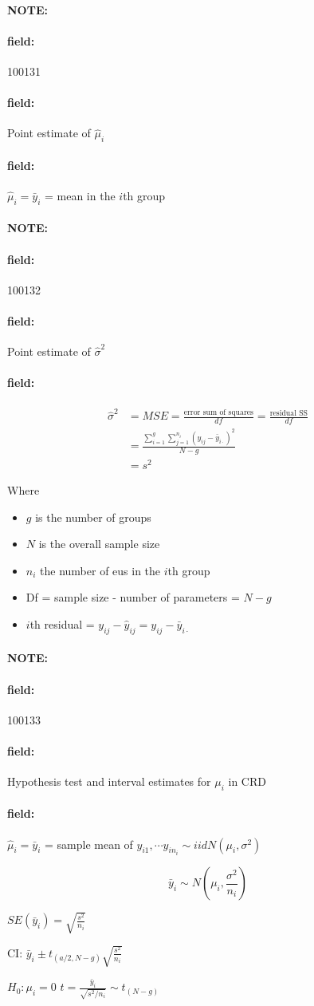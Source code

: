 \documentclass[12pt]{article}
\newenvironment{note}{\paragraph{NOTE:}}{}
\newenvironment{field}{\paragraph{field:}}{}
\begin{document}
\begin{note}
\begin{field}
  \tiny 100131
\end{field}
\begin{field}
  Point estimate of $\hat{\mu}_i$
\end{field}
\begin{field}
  $\hat{\mu}_i = \bar{y}_i$ = mean in the $i$th group
\end{field}
\end{note}

\begin{note}
    \begin{field}
        \tiny 100132
    \end{field}
    \begin{field}
        Point estimate of
        $\hat{\sigma}^2$
    \end{field}
    \begin{field}
        \begin{align}
          \hat{\sigma}^2 &= MSE = \frac{\text{error sum of squares}}{df} = \frac{\text{residual SS}}{df}\\
          &= \frac{\sum_{i=1}^g \sum_{j=1}^{n_i}(y_{ij} - \bar{y}_{i\cdot})^2}{N-g}\\
          &= s^2
        \end{align}

        Where
        \begin{itemize}
          \item $g$ is the number of groups
          \item $N$ is the overall sample size
          \item $n_i$ the number of eus in the $i$th group
          \item Df = sample size - number of parameters = $N-g$
          \item $i$th residual = $y_{ij} - \hat{y}_{ij} = y_{ij} - \bar{y}_{i\cdot }$
        \end{itemize}
    \end{field}
\end{note}

\begin{note}
    \begin{field}
        \tiny 100133
    \end{field}
    \begin{field}
        Hypothesis test and interval estimates for $\mu_i$ in CRD
    \end{field}
    \begin{field}
        $\hat{\mu}_i = \bar{y}_i$ = sample mean of $y_{i1}, \cdots y_{in_{i}} \sim iid N(\mu_i,\sigma^2)$

        $$ \bar{y}_i \sim N(\mu_i, \frac{\sigma^2}{n_i})$$

        $SE(\bar{y}_i) = \sqrt{\frac{s^2}{n_i}}$

        CI: $\bar{y}_i \pm t_{(a/2,N-g)} \sqrt{\frac{s^2}{n_i}}$

        $H_0: \mu_i = 0$
        $t = \frac{\bar{y}_i}{\sqrt{s^2/n_i}} \sim t_{(N-g)}$

    \end{field}
\end{note}
\end{document}

